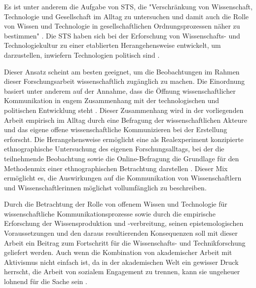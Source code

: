 Es ist unter anderem die Aufgabe von STS, die "Verschränkung von Wissenschaft, Technologie und Gesellschaft im Alltag zu untersuchen und damit auch die Rolle von Wissen und Technologie in gesellschaftlichen Ordnungsprozessen näher zu bestimmen" \cite{beck_2014_science}. Die STS haben sich bei der Erforschung von Wissenschafts- und Technologiekultur zu einer etablierten Herangehensweise entwickelt, um darzustellen, inwiefern Technologien politisch sind \cite{kelty_2014_freedom}.

Dieser Ansatz scheint am besten geeignet, um die Beobachtungen im Rahmen dieser Forschungsarbeit wissenschaftlich zugänglich zu machen. Die Einordnung basiert unter anderem auf der Annahme, dass die Öffnung wissenschaftlicher Kommunikation in engem Zusammenhang mit der technologischen und politischen Entwicklung steht \cite{weingart_2005_wissenschaft}. Dieser Zusammenhang wird in der vorliegenden Arbeit empirisch im Alltag durch eine Befragung der wissenschaftlichen Akteure und das eigene offene wissenschaftliche Kommunizieren bei der Erstellung erforscht. Die Herangehensweise ermöglicht eine als Realexperiment konzipierte ethnographische Untersuchung des eigenen Forschungsalltags, bei der die teilnehmende Beobachtung sowie die Online-Befragung die Grundlage für den Methodenmix einer ethnographischen Betrachtung darstellen \cite{bachmann_2011_ethnographie}. Dieser Mix ermöglicht es, die Auswirkungen auf die Kommunikation von Wissenschaftlern und Wissenschaftlerinnen möglichst vollumfänglich zu beschreiben.

Durch die Betrachtung der Rolle von offenem Wissen und Technologie für wissenschaftliche Kommunikationsprozesse sowie durch die empirische Erforschung der Wissensproduktion und -verbreitung, seinen epistemologischen Voraussetzungen und den daraus resultierenden Konsequenzen \cite{beck_2014_science} soll mit dieser Arbeit ein Beitrag zum Fortschritt für die Wissenschafts- und Technikforschung geliefert werden. Auch wenn die Kombination von akademischer Arbeit mit Aktivismus nicht einfach ist, da in der akademischen Welt ein gewisser Druck herrscht, die Arbeit von sozialem Engagement zu trennen, kann sie ungeheuer lohnend für die Sache sein \cite[:25]{flood_2013_combining}.
